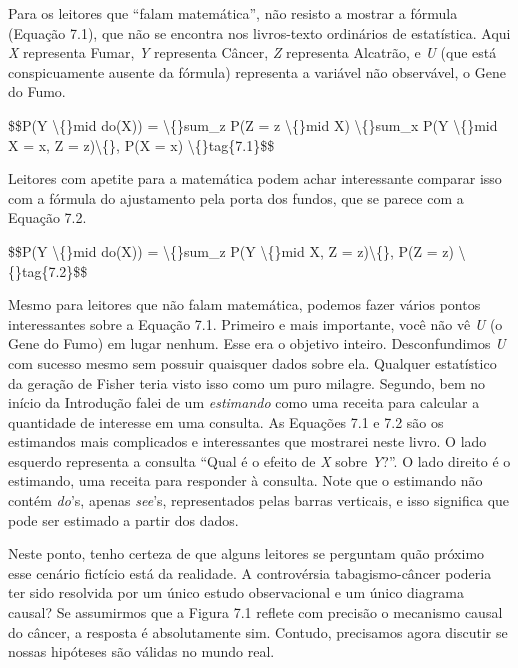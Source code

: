 \documentclass[11pt,a5paper,twoside]{book}
\begin{document}
Para os leitores que “falam matemática”, não resisto a mostrar a fórmula (Equação 7.1), que não se encontra nos livros-texto ordinários de estatística. Aqui \textit{X} representa Fumar, \textit{Y} representa Câncer, \textit{Z} representa Alcatrão, e \textit{U} (que está conspicuamente ausente da fórmula) representa a variável não observável, o Gene do Fumo.

\$\$P(Y \textbackslash\{\}mid do(X)) = \textbackslash\{\}sum\_z P(Z = z \textbackslash\{\}mid X) \textbackslash\{\}sum\_x P(Y \textbackslash\{\}mid X = x, Z = z)\textbackslash\{\}, P(X = x) \textbackslash\{\}tag\{7.1\}\$\$

Leitores com apetite para a matemática podem achar interessante comparar isso com a fórmula do ajustamento pela porta dos fundos, que se parece com a Equação 7.2.

\$\$P(Y \textbackslash\{\}mid do(X)) = \textbackslash\{\}sum\_z P(Y \textbackslash\{\}mid X, Z = z)\textbackslash\{\}, P(Z = z) \textbackslash\{\}tag\{7.2\}\$\$

Mesmo para leitores que não falam matemática, podemos fazer vários pontos interessantes sobre a Equação 7.1. Primeiro e mais importante, você não vê \textit{U} (o Gene do Fumo) em lugar nenhum. Esse era o objetivo inteiro. Desconfundimos \textit{U} com sucesso mesmo sem possuir quaisquer dados sobre ela. Qualquer estatístico da geração de Fisher teria visto isso como um puro milagre. Segundo, bem no início da Introdução falei de um \textit{estimando} como uma receita para calcular a quantidade de interesse em uma consulta. As Equações 7.1 e 7.2 são os estimandos mais complicados e interessantes que mostrarei neste livro. O lado esquerdo representa a consulta “Qual é o efeito de \textit{X} sobre \textit{Y}?”. O lado direito é o estimando, uma receita para responder à consulta. Note que o estimando não contém \textit{do}’s, apenas \textit{see}’s, representados pelas barras verticais, e isso significa que pode ser estimado a partir dos dados.

Neste ponto, tenho certeza de que alguns leitores se perguntam quão próximo esse cenário fictício está da realidade. A controvérsia tabagismo-câncer poderia ter sido resolvida por um único estudo observacional e um único diagrama causal? Se assumirmos que a Figura 7.1 reflete com precisão o mecanismo causal do câncer, a resposta é absolutamente sim. Contudo, precisamos agora discutir se nossas hipóteses são válidas no mundo real.
\end{document}
